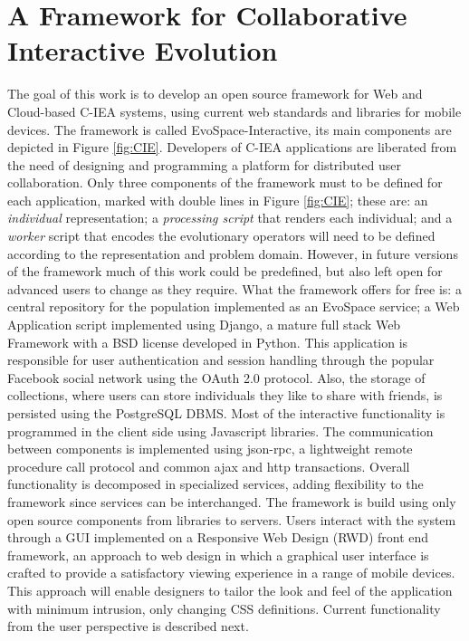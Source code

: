 \documentclass{llncs}
\begin{document}
\section{A Framework for Collaborative Interactive Evolution}
\label{sec:collaborative}
The goal of this work is to develop an open source framework for Web and Cloud-based C-IEA systems,
using current web standards and libraries for mobile devices.
The framework is called EvoSpace-Interactive, its main components are depicted in Figure \ref{fig:CIE}.
Developers of C-IEA applications are liberated from the need of designing and programming a platform for distributed user collaboration.
Only three components of the framework  must to be defined for each application, marked with double lines in Figure \ref{fig:CIE}; these are:
an \emph{individual} representation; a \emph{processing script} that renders each individual;
and a \emph{worker} script that encodes the evolutionary operators will need to be defined according to the representation and problem domain.
However, in future versions of the framework much of this work could be predefined, but also left open for advanced users to change as they require.
What the framework offers for free is: a central repository for the population implemented as an EvoSpace service; a Web Application script implemented using Django, a mature full stack Web Framework with a BSD license developed in Python.
This application is responsible for user authentication and session handling through the popular Facebook social network using the OAuth 2.0 protocol.
Also, the storage of collections, where users can store individuals they like to share with friends, is persisted using the PostgreSQL DBMS.
Most of the interactive functionality is programmed in the client side using Javascript libraries.
The communication between components is implemented using json-rpc, a lightweight remote procedure call protocol and common ajax and http transactions.
Overall functionality is decomposed in specialized services, adding flexibility to the framework since services can be interchanged.
The framework is build using only open source components from libraries to servers.
Users interact with the system through a GUI implemented on a Responsive Web Design (RWD) front end framework,
an approach to web design in which a graphical user interface is crafted to provide a satisfactory  viewing experience in a range of mobile devices.
This approach will enable designers to tailor the look and feel of the application with minimum intrusion, only changing CSS definitions.
Current functionality from the user perspective is described next.
\end{document}
